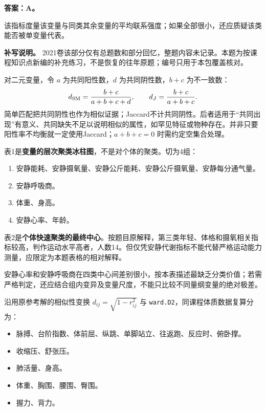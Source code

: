 
\textbf{答案：A。}

该指标度量该变量与同类其余变量的平均联系强度；如果全部很小，还应质疑该类能否被单变量代表。


\textbf{补写说明。} 2021卷该部分仅有总题数和部分回忆，整题内容未记录。本题为按课程知识点新编的补充练习，不是恢复的往年原题；编号只用于本包覆盖核对。



对二元变量，令 \(a\) 为共同阳性数，\(d\) 为共同阴性数，\(b+c\) 为不一致数： \[d_{\rm SM}=\frac{b+c}{a+b+c+d},\qquad d_J=\frac{b+c}{a+b+c}.\] 简单匹配把共同阴性也作为相似证据；Jaccard不计共同阴性。后者适用于``共同出现''有意义、共同缺失不足以说明相似的属性，如罕见特征或物种存在。并非只要阳性率不均衡就一定使用Jaccard；\(a+b+c=0\) 时需约定空集合处理。



表1是\textbf{变量的层次聚类冰柱图}，不是对个体的聚类。切为4组：

\begin{enumerate}
\def\labelenumi{\arabic{enumi}.}
\tightlist
\item
  安静能耗、安静摄氧量、安静公斤能耗、安静公斤摄氧量、安静每分通气量。
\item
  安静呼吸商。
\item
  体重、身高。
\item
  安静心率、年龄。
\end{enumerate}

表2是\textbf{个体快速聚类的最终中心}。按题目原解释，第三类年轻、体格和摄氧相关指标较高，判作运动水平高者，人数14。但仅凭安静代谢指标不能代替严格运动能力测量，应限定为本题表格的相对解释。

安静心率和安静呼吸商在四类中心间差别很小，按本表描述最缺乏分类价值；若需严格判定，还应结合组内变异及变量尺度，不能只比较不同量纲变量的绝对极差。



沿用原参考解的相似性变换 \(d_{ij}=\sqrt{1-r_{ij}^2}\) 与 \texttt{ward.D2}，同课程体质数据复算分为：

\begin{itemize}
\tightlist
\item
  脉搏、台阶指数、体前屈、纵跳、单脚站立、往返跑、反应时、俯卧撑。
\item
  收缩压、舒张压。
\item
  肺活量、身高。
\item
  体重、胸围、腰围、臀围。
\item
  握力、背力。
\end{itemize}

